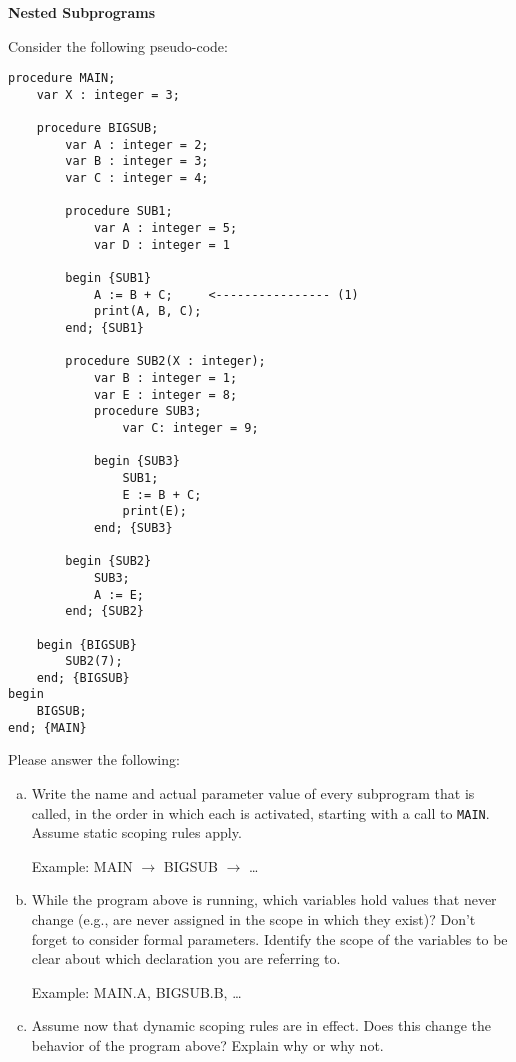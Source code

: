 \documentclass{exam}
\begin{document}
\begin{questions}
\begin{enumerate}
\end{enumerate}



\newpage
\question[15] \textbf{Nested Subprograms}


Consider the following pseudo-code:
\begin{verbatim}
procedure MAIN;
    var X : integer = 3;
    
    procedure BIGSUB;
        var A : integer = 2;
        var B : integer = 3;
        var C : integer = 4;
				
        procedure SUB1;
            var A : integer = 5;
            var D : integer = 1
						
        begin {SUB1}
            A := B + C;     <---------------- (1)
            print(A, B, C);
        end; {SUB1}
				
        procedure SUB2(X : integer);
            var B : integer = 1;
            var E : integer = 8;
            procedure SUB3;
                var C: integer = 9;
								
            begin {SUB3}
                SUB1;
                E := B + C;
                print(E);
            end; {SUB3}
						
        begin {SUB2}
            SUB3;
            A := E;
        end; {SUB2}
				
    begin {BIGSUB}
        SUB2(7);
    end; {BIGSUB}
begin
    BIGSUB;
end; {MAIN}

\end{verbatim}

Please answer the following:
\begin{enumerate}[a.]

\item Write the name and actual parameter value of every subprogram that is called, in the order in which each is activated, 
starting with a call to \verb|MAIN|.  Assume static scoping rules apply.

{ \color{red} Example: MAIN $\rightarrow$ BIGSUB $\rightarrow$ \ldots }

\item While the program above is running, which variables hold values that never change (e.g., are never assigned in the scope in which
they exist)?  Don't forget to consider formal parameters.
Identify the scope of the variables to be clear about which declaration you are referring to. 

{ \color{red} Example: MAIN.A, BIGSUB.B, \ldots }

\item Assume now that dynamic scoping rules are in effect.  Does this change the behavior of the program above?  Explain why or why not.


\end{enumerate}
\end{questions}
\end{document}

